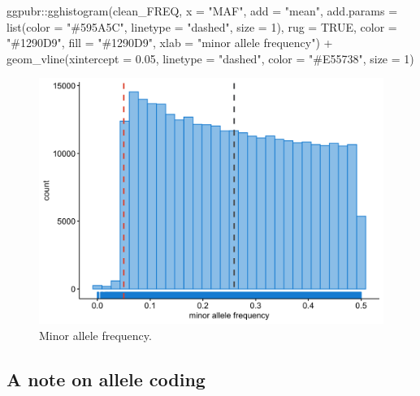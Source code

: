 \documentclass[
]{book}
\newenvironment{Shaded}{\begin{snugshade}}{\end{snugshade}}
\newcommand{\AttributeTok}[1]{\textcolor[rgb]{0.77,0.63,0.00}{#1}}
\newcommand{\ConstantTok}[1]{\textcolor[rgb]{0.00,0.00,0.00}{#1}}
\newcommand{\DecValTok}[1]{\textcolor[rgb]{0.00,0.00,0.81}{#1}}
\newcommand{\FloatTok}[1]{\textcolor[rgb]{0.00,0.00,0.81}{#1}}
\newcommand{\FunctionTok}[1]{\textcolor[rgb]{0.00,0.00,0.00}{#1}}
\newcommand{\NormalTok}[1]{#1}
\newcommand{\SpecialCharTok}[1]{\textcolor[rgb]{0.00,0.00,0.00}{#1}}
\newcommand{\StringTok}[1]{\textcolor[rgb]{0.31,0.60,0.02}{#1}}
\begin{document}
\begin{Shaded}
\begin{Highlighting}[]
\NormalTok{ggpubr}\SpecialCharTok{::}\FunctionTok{gghistogram}\NormalTok{(clean\_FREQ, }\AttributeTok{x =} \StringTok{"MAF"}\NormalTok{,}
                    \AttributeTok{add =} \StringTok{"mean"}\NormalTok{, }\AttributeTok{add.params =} \FunctionTok{list}\NormalTok{(}\AttributeTok{color =} \StringTok{"\#595A5C"}\NormalTok{, }\AttributeTok{linetype =} \StringTok{"dashed"}\NormalTok{, }\AttributeTok{size =} \DecValTok{1}\NormalTok{),}
                    \AttributeTok{rug =} \ConstantTok{TRUE}\NormalTok{,}
                    \AttributeTok{color =} \StringTok{"\#1290D9"}\NormalTok{, }\AttributeTok{fill =} \StringTok{"\#1290D9"}\NormalTok{,}
                    \AttributeTok{xlab =} \StringTok{"minor allele frequency"}\NormalTok{) }\SpecialCharTok{+}
  \FunctionTok{geom\_vline}\NormalTok{(}\AttributeTok{xintercept =} \FloatTok{0.05}\NormalTok{, }\AttributeTok{linetype =} \StringTok{"dashed"}\NormalTok{,}
                \AttributeTok{color =} \StringTok{"\#E55738"}\NormalTok{, }\AttributeTok{size =} \DecValTok{1}\NormalTok{)}
\end{Highlighting}
\end{Shaded}

\begin{figure}

{\centering \includegraphics[width=18.67in]{img/_gwas/show-freq} 

}

\caption{Minor allele frequency.}\label{fig:show-freq}
\end{figure}

\hypertarget{a-note-on-allele-coding}{%
\subsection{A note on allele coding}\label{a-note-on-allele-coding}}
\end{document}
